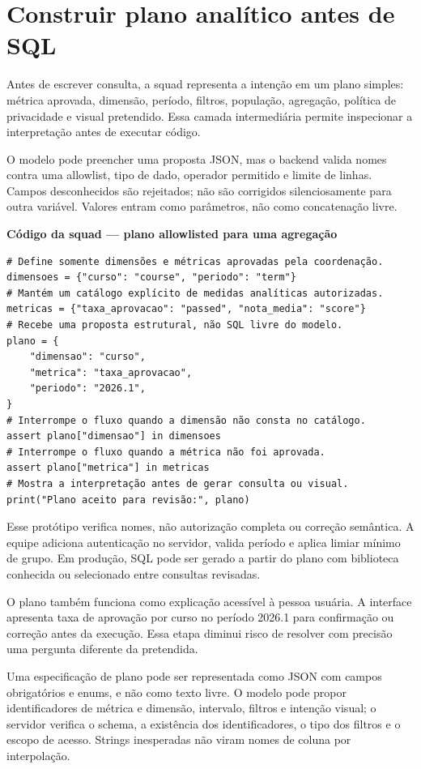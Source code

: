 \section{Construir plano analítico antes de SQL}

Antes de escrever consulta, a squad representa a intenção em um plano simples: métrica aprovada, dimensão, período, filtros, população, agregação, política de privacidade e visual pretendido. Essa camada intermediária permite inspecionar a interpretação antes de executar código.

O modelo pode preencher uma proposta JSON, mas o backend valida nomes contra uma allowlist, tipo de dado, operador permitido e limite de linhas. Campos desconhecidos são rejeitados; não são corrigidos silenciosamente para outra variável. Valores entram como parâmetros, não como concatenação livre.

\textbf{Código da squad --- plano allowlisted para uma agregação}
\begin{verbatim}
# Define somente dimensões e métricas aprovadas pela coordenação.
dimensoes = {"curso": "course", "periodo": "term"}
# Mantém um catálogo explícito de medidas analíticas autorizadas.
metricas = {"taxa_aprovacao": "passed", "nota_media": "score"}
# Recebe uma proposta estrutural, não SQL livre do modelo.
plano = {
    "dimensao": "curso",
    "metrica": "taxa_aprovacao",
    "periodo": "2026.1",
}
# Interrompe o fluxo quando a dimensão não consta no catálogo.
assert plano["dimensao"] in dimensoes
# Interrompe o fluxo quando a métrica não foi aprovada.
assert plano["metrica"] in metricas
# Mostra a interpretação antes de gerar consulta ou visual.
print("Plano aceito para revisão:", plano)
\end{verbatim}

Esse protótipo verifica nomes, não autorização completa ou correção semântica. A equipe adiciona autenticação no servidor, valida período e aplica limiar mínimo de grupo. Em produção, SQL pode ser gerado a partir do plano com biblioteca conhecida ou selecionado entre consultas revisadas.

O plano também funciona como explicação acessível à pessoa usuária. A interface apresenta taxa de aprovação por curso no período 2026.1 para confirmação ou correção antes da execução. Essa etapa diminui risco de resolver com precisão uma pergunta diferente da pretendida.

Uma especificação de plano pode ser representada como JSON com campos obrigatórios e enums, e não como texto livre. O modelo pode propor identificadores de métrica e dimensão, intervalo, filtros e intenção visual; o servidor verifica o schema, a existência dos identificadores, o tipo dos filtros e o escopo de acesso. Strings inesperadas não viram nomes de coluna por interpolação.

